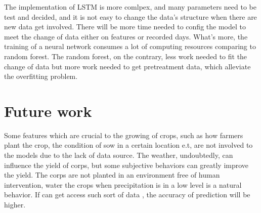 \documentclass[conference]{IEEEtran}
\begin{document}
The implementation of LSTM is more comlpex, and many parameters need to be test and decided, and it is not easy to change the data's structure when there are new data get involved. There will be more time needed to config the model to meet the change of data either on features or recorded days. What's more, the training of a neural network consumes a lot of computing resources comparing to random forest. The random forest, on the contrary, less work needed to fit the change of data but more work needed to get pretreatment data, which alleviate the overfitting problem.

\section{Future work}
Some features which are crucial to the growing of crops, such as how farmers plant the crop, the condition of sow in a certain location e.t, are not involved to the models due to the lack of data source. The weather, undoubtedly, can influence the yield of corps, but some subjective behaviors can greatly improve the yield. The corps are not planted in an environment free of human intervention, water the crops when precipitation is in a low level is a natural behavior. If can get access such sort of data , the accuracy of prediction will be higher. 



\end{document}
